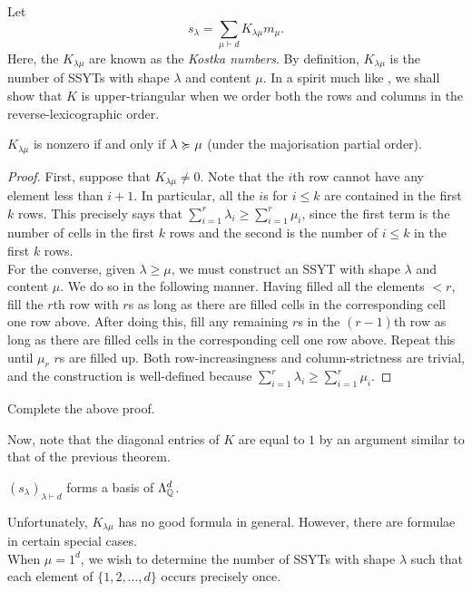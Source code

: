 	Let
	\begin{equation}
		\label{eqn: kostka}
		s_\lambda = \sum_{\mu \vdash d} K_{\lambda\mu} m_\mu.
	\end{equation}
	Here, the $K_{\lambda\mu}$ are known as the \emph{Kostka numbers}. By definition, $K_{\lambda\mu}$ is the number of SSYTs with shape $\lambda$ and content $\mu$. In a spirit much like , we shall show that $K$ is upper-triangular when we order both the rows and columns in the reverse-lexicographic order.

	\begin{ftheo}
		$K_{\lambda\mu}$ is nonzero if and only if $\lambda \succcurlyeq \mu$ (under the majorisation partial order).
	\end{ftheo}
	\begin{proof}
		First, suppose that $K_{\lambda\mu} \ne 0$. Note that the $i$th row cannot have any element less than $i+1$. In particular, all the $i$s for $i\le k$ are contained in the first $k$ rows. This precisely says that $\sum_{i=1}^r \lambda_i \ge \sum_{i=1}^r \mu_i$, since the first term is the number of cells in the first $k$ rows and the second is the number of $i \le k$ in the first $k$ rows.\\
		For the converse, given $\lambda \ge \mu$, we must construct an SSYT with shape $\lambda$ and content $\mu$. We do so in the following manner. Having filled all the elements $<r$, fill the $r$th row with $r$s as long as there are filled cells in the corresponding cell one row above. After doing this, fill any remaining $r$s in the $(r-1)$th row as long as there are filled cells in the corresponding cell one row above. Repeat this until $\mu_r$ $r$s are filled up. Both row-increasingness and column-strictness are trivial, and the construction is well-defined because $\sum_{i=1}^r \lambda_i \ge \sum_{i=1}^r \mu_i$.
	\end{proof}

	\begin{exercise}
		Complete the above proof.
	\end{exercise}

	Now, note that the diagonal entries of $K$ are equal to $1$ by an argument similar to that of the previous theorem.
	\begin{fcor}
		$(s_\lambda)_{\lambda \vdash d}$ forms a basis of $\Lambda_{\mathbb{Q}}^d$. 
	\end{fcor}

	Unfortunately, $K_{\lambda\mu}$ has no good formula in general. However, there are formulae in certain special cases.\\
	When $\mu = 1^d$, we wish to determine the number of SSYTs with shape $\lambda$ such that each element of $\{1,2,\ldots,d\}$ occurs precisely once.

